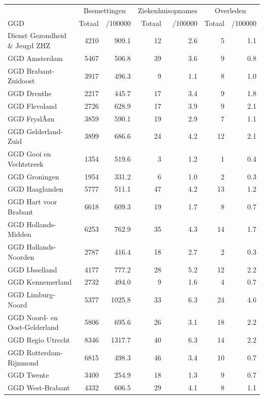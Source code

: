 \documentclass[
  english,
  man,floatsintext]{apa6}
\begin{document}
\begin{table}
\centering\begingroup\fontsize{10}{12}\selectfont

\begin{threeparttable}
\begin{tabular}{lrrrrrr}
\toprule
\multicolumn{1}{c}{ } & \multicolumn{2}{c}{Besmettingen} & \multicolumn{2}{c}{Ziekenhuisopnames} & \multicolumn{2}{c}{Overleden} \\
\cmidrule(l{3pt}r{3pt}){2-3} \cmidrule(l{3pt}r{3pt}){4-5} \cmidrule(l{3pt}r{3pt}){6-7}
GGD & Totaal & /100000 & Totaal & /100000 & Totaal & /100000\\
\midrule
Dienst Gezondheid \& Jeugd ZHZ & 4210 & 909.1 & 12 & 2.6 & 5 & 1.1\\
GGD Amsterdam & 5467 & 506.8 & 39 & 3.6 & 9 & 0.8\\
GGD Brabant-Zuidoost & 3917 & 496.3 & 9 & 1.1 & 8 & 1.0\\
GGD Drenthe & 2217 & 445.7 & 17 & 3.4 & 9 & 1.8\\
GGD Flevoland & 2726 & 628.9 & 17 & 3.9 & 9 & 2.1\\
GGD FryslÃ¢n & 3859 & 590.1 & 19 & 2.9 & 7 & 1.1\\
GGD Gelderland-Zuid & 3899 & 686.6 & 24 & 4.2 & 12 & 2.1\\
GGD Gooi en Vechtstreek & 1354 & 519.6 & 3 & 1.2 & 1 & 0.4\\
GGD Groningen & 1954 & 331.2 & 6 & 1.0 & 2 & 0.3\\
GGD Haaglanden & 5777 & 511.1 & 47 & 4.2 & 13 & 1.2\\
GGD Hart voor Brabant & 6618 & 609.3 & 19 & 1.7 & 8 & 0.7\\
GGD Hollands-Midden & 6253 & 762.9 & 35 & 4.3 & 14 & 1.7\\
GGD Hollands-Noorden & 2787 & 416.4 & 18 & 2.7 & 2 & 0.3\\
GGD IJsselland & 4177 & 777.2 & 28 & 5.2 & 12 & 2.2\\
GGD Kennemerland & 2732 & 494.0 & 9 & 1.6 & 4 & 0.7\\
GGD Limburg-Noord & 5377 & 1025.8 & 33 & 6.3 & 24 & 4.6\\
GGD Noord- en Oost-Gelderland & 5806 & 695.6 & 26 & 3.1 & 18 & 2.2\\
GGD Regio Utrecht & 8346 & 1317.7 & 40 & 6.3 & 14 & 2.2\\
GGD Rotterdam-Rijnmond & 6815 & 498.3 & 46 & 3.4 & 10 & 0.7\\
GGD Twente & 3400 & 254.9 & 18 & 1.3 & 9 & 0.7\\
GGD West-Brabant & 4332 & 606.5 & 29 & 4.1 & 8 & 1.1\\

\end{tabular}
\end{threeparttable}
\end{table}
\end{document}
